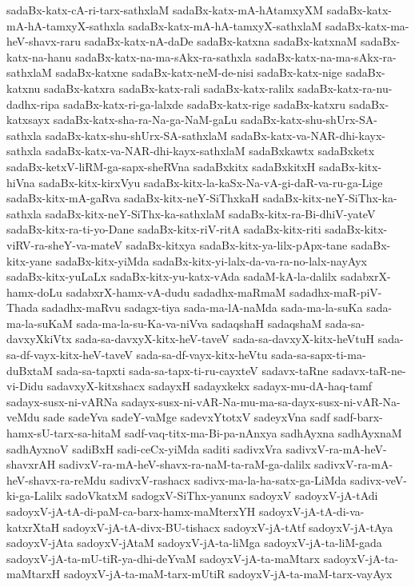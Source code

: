 {sadaBx-katx-cA-ri-tarx-sathxlaM
sadaBx-katx-mA-hAtamxyXM
sadaBx-katx-mA-hA-tamxyX-sathxla
sadaBx-katx-mA-hA-tamxyX-sathxlaM
sadaBx-katx-ma-heV-shavx-raru
sadaBx-katx-nA-daDe
sadaBx-katxna
sadaBx-katxnaM
sadaBx-katx-na-hanu
sadaBx-katx-na-ma-sAkx-ra-sathxla
sadaBx-katx-na-ma-sAkx-ra-sathxlaM
sadaBx-katxne
sadaBx-katx-neM-de-nisi
sadaBx-katx-nige
sadaBx-katxnu
sadaBx-katxra
sadaBx-katx-rali
sadaBx-katx-ralilx
sadaBx-katx-ra-nu-dadhx-ripa
sadaBx-katx-ri-ga-lalxde
sadaBx-katx-rige
sadaBx-katxru
sadaBx-katxsayx
sadaBx-katx-sha-ra-Na-ga-NaM-gaLu
sadaBx-katx-shu-shUrx-SA-sathxla
sadaBx-katx-shu-shUrx-SA-sathxlaM
sadaBx-katx-va-NAR-dhi-kayx-sathxla
sadaBx-katx-va-NAR-dhi-kayx-sathxlaM
sadaBxkawtx
sadaBxketx
sadaBx-ketxV-liRM-ga-sapx-sheRVna
sadaBxkitx
sadaBxkitxH
sadaBx-kitx-hiVna
sadaBx-kitx-kirxVyu
sadaBx-kitx-la-kaSx-Na-vA-gi-daR-va-ru-ga-Lige
sadaBx-kitx-mA-gaRva
sadaBx-kitx-neY-SiThxkaH
sadaBx-kitx-neY-SiThx-ka-sathxla
sadaBx-kitx-neY-SiThx-ka-sathxlaM
sadaBx-kitx-ra-Bi-dhiV-yateV
sadaBx-kitx-ra-ti-yo-Dane
sadaBx-kitx-riV-ritA
sadaBx-kitx-riti
sadaBx-kitx-viRV-ra-sheY-va-mateV
sadaBx-kitxya
sadaBx-kitx-ya-lilx-pApx-tane
sadaBx-kitx-yane
sadaBx-kitx-yiMda
sadaBx-kitx-yi-lalx-da-va-ra-no-lalx-nayAyx
sadaBx-kitx-yuLaLx
sadaBx-kitx-yu-katx-vAda
sadaM-kA-la-dalilx
sadabxrX-hamx-doLu
sadabxrX-hamx-vA-dudu
sadadhx-maRmaM
sadadhx-maR-piV-Thada
sadadhx-maRvu
sadagx-tiya
sada-ma-lA-naMda
sada-ma-la-suKa
sada-ma-la-suKaM
sada-ma-la-su-Ka-va-niVva
sadaqshaH
sadaqshaM
sada-sa-davxyXkiVtx
sada-sa-davxyX-kitx-heV-taveV
sada-sa-davxyX-kitx-heVtuH
sada-sa-df-vayx-kitx-heV-taveV
sada-sa-df-vayx-kitx-heVtu
sada-sa-sapx-ti-ma-duBxtaM
sada-sa-tapxti
sada-sa-tapx-ti-ru-cayxteV
sadavx-taRne
sadavx-taR-ne-vi-Didu
sadavxyX-kitxshacx
sadayxH
sadayxkekx
sadayx-mu-dA-haq-tamf
sadayx-susx-ni-vARNa
sadayx-susx-ni-vAR-Na-mu-ma-sa-dayx-susx-ni-vAR-Na-veMdu
sade
sadeYva
sadeY-vaMge
sadevxYtotxV
sadeyxVna
sadf
sadf-barx-hamx-sU-tarx-sa-hitaM
sadf-vaq-titx-ma-Bi-pa-nAnxya
sadhAyxna
sadhAyxnaM
sadhAyxnoV
sadiBxH
sadi-ceCx-yiMda
saditi
sadivxVra
sadivxV-ra-mA-heV-shavxrAH
sadivxV-ra-mA-heV-shavx-ra-naM-ta-raM-ga-dalilx
sadivxV-ra-mA-heV-shavx-ra-reMdu
sadivxV-rashacx
sadivx-ma-la-ha-satx-ga-LiMda
sadivx-veV-ki-ga-Lalilx
sadoVkatxM
sadogxV-SiThx-yanunx
sadoyxV
sadoyxV-jA-tAdi
sadoyxV-jA-tA-di-paM-ca-barx-hamx-maMterxYH
sadoyxV-jA-tA-di-va-katxrXtaH
sadoyxV-jA-tA-divx-BU-tishacx
sadoyxV-jA-tAtf
sadoyxV-jA-tAya
sadoyxV-jAta
sadoyxV-jAtaM
sadoyxV-jA-ta-liMga
sadoyxV-jA-ta-liM-gada
sadoyxV-jA-ta-mU-tiR-ya-dhi-deYvaM
sadoyxV-jA-ta-maMtarx
sadoyxV-jA-ta-maMtarxH
sadoyxV-jA-ta-maM-tarx-mUtiR
sadoyxV-jA-ta-maM-tarx-vayAyx
}
